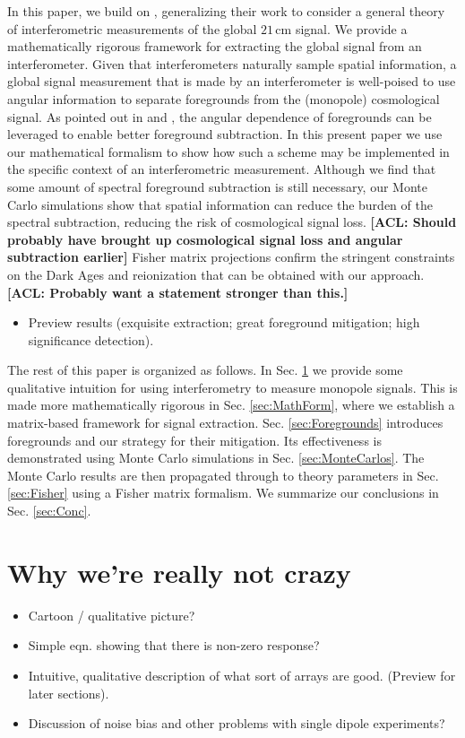 \documentclass[twolcolumn,apj]{emulateapj}
\newcommand{\acl}[1]{{\color{red} \textbf{[ACL:  #1]}}}
\begin{document}
In this paper, we build on \citet{VedanthamLOFAR2}, generalizing their work to consider a general theory of interferometric measurements of the global $21\,\textrm{cm}$ signal.  We provide a mathematically rigorous framework for extracting the global signal from an interferometer.  Given that interferometers naturally sample spatial information, a global signal measurement that is made by an interferometer is well-poised to use angular information to separate foregrounds from the (monopole) cosmological signal.  As pointed out in \citep{L13} and \citep{Liu_Switzer_2014}, the angular dependence of foregrounds can be leveraged to enable better foreground subtraction.  In this present paper we use our mathematical formalism to show how such a scheme may be implemented in the specific context of an interferometric measurement.  Although we find that some amount of spectral foreground subtraction is still necessary, our Monte Carlo simulations show that spatial information can reduce the burden of the spectral subtraction, reducing the risk of cosmological signal loss.  \acl{Should probably have brought up cosmological signal loss and angular subtraction earlier}  Fisher matrix projections confirm the stringent constraints on the Dark Ages and reionization that can be obtained with our approach.  \acl{Probably want a statement stronger than this.}

\begin{itemize}
\item Preview results (exquisite extraction; great foreground mitigation; high significance detection).
\end{itemize}

The rest of this paper is organized as follows.  In Sec. \ref{sec:QualitativePic} we provide some qualitative intuition for using interferometry to measure monopole signals.  This is made more mathematically rigorous in Sec. \ref{sec:MathForm}, where we establish a matrix-based framework for signal extraction.  Sec. \ref{sec:Foregrounds} introduces foregrounds and our strategy for their mitigation.  Its effectiveness is demonstrated using Monte Carlo simulations in Sec. \ref{sec:MonteCarlos}.  The Monte Carlo results are then propagated through to theory parameters in Sec. \ref{sec:Fisher} using a Fisher matrix formalism.  We summarize our conclusions in Sec. \ref{sec:Conc}.

\section{Why we're really not crazy}
\label{sec:QualitativePic}
\begin{itemize}
\item Cartoon / qualitative picture?
\item Simple eqn. showing that there is non-zero response?
\item Intuitive, qualitative description of what sort of arrays are good.  (Preview for later sections).
\item Discussion of noise bias and other problems with single dipole experiments?
\end{itemize}
\end{document}
